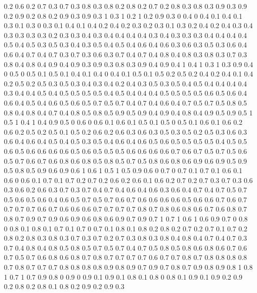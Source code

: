 0.2 0.6
0.2 0.7
0.3 0.7
0.3 0.8
0.3 0.8
0.2 0.8
0.2 0.7
0.2 0.8
0.3 0.8
0.3 0.9
0.3 0.9
0.2 0.9
0.2 0.8
0.2 0.9
0.3 0.9
0.3 1
0.3 1
0.2 1
0.2 0.9
0.3 0
0.4 0
0.4 0.1
0.4 0.1
0.3 0.1
0.3 0
0.3 0.1
0.4 0.1
0.4 0.2
0.4 0.2
0.3 0.2
0.3 0.1
0.3 0.2
0.4 0.2
0.4 0.3
0.4 0.3
0.3 0.3
0.3 0.2
0.3 0.3
0.4 0.3
0.4 0.4
0.4 0.4
0.3 0.4
0.3 0.3
0.3 0.4
0.4 0.4
0.4 0.5
0.4 0.5
0.3 0.5
0.3 0.4
0.3 0.5
0.4 0.5
0.4 0.6
0.4 0.6
0.3 0.6
0.3 0.5
0.3 0.6
0.4 0.6
0.4 0.7
0.4 0.7
0.3 0.7
0.3 0.6
0.3 0.7
0.4 0.7
0.4 0.8
0.4 0.8
0.3 0.8
0.3 0.7
0.3 0.8
0.4 0.8
0.4 0.9
0.4 0.9
0.3 0.9
0.3 0.8
0.3 0.9
0.4 0.9
0.4 1
0.4 1
0.3 1
0.3 0.9
0.4 0
0.5 0
0.5 0.1
0.5 0.1
0.4 0.1
0.4 0
0.4 0.1
0.5 0.1
0.5 0.2
0.5 0.2
0.4 0.2
0.4 0.1
0.4 0.2
0.5 0.2
0.5 0.3
0.5 0.3
0.4 0.3
0.4 0.2
0.4 0.3
0.5 0.3
0.5 0.4
0.5 0.4
0.4 0.4
0.4 0.3
0.4 0.4
0.5 0.4
0.5 0.5
0.5 0.5
0.4 0.5
0.4 0.4
0.4 0.5
0.5 0.5
0.5 0.6
0.5 0.6
0.4 0.6
0.4 0.5
0.4 0.6
0.5 0.6
0.5 0.7
0.5 0.7
0.4 0.7
0.4 0.6
0.4 0.7
0.5 0.7
0.5 0.8
0.5 0.8
0.4 0.8
0.4 0.7
0.4 0.8
0.5 0.8
0.5 0.9
0.5 0.9
0.4 0.9
0.4 0.8
0.4 0.9
0.5 0.9
0.5 1
0.5 1
0.4 1
0.4 0.9
0.5 0
0.6 0
0.6 0.1
0.6 0.1
0.5 0.1
0.5 0
0.5 0.1
0.6 0.1
0.6 0.2
0.6 0.2
0.5 0.2
0.5 0.1
0.5 0.2
0.6 0.2
0.6 0.3
0.6 0.3
0.5 0.3
0.5 0.2
0.5 0.3
0.6 0.3
0.6 0.4
0.6 0.4
0.5 0.4
0.5 0.3
0.5 0.4
0.6 0.4
0.6 0.5
0.6 0.5
0.5 0.5
0.5 0.4
0.5 0.5
0.6 0.5
0.6 0.6
0.6 0.6
0.5 0.6
0.5 0.5
0.5 0.6
0.6 0.6
0.6 0.7
0.6 0.7
0.5 0.7
0.5 0.6
0.5 0.7
0.6 0.7
0.6 0.8
0.6 0.8
0.5 0.8
0.5 0.7
0.5 0.8
0.6 0.8
0.6 0.9
0.6 0.9
0.5 0.9
0.5 0.8
0.5 0.9
0.6 0.9
0.6 1
0.6 1
0.5 1
0.5 0.9
0.6 0
0.7 0
0.7 0.1
0.7 0.1
0.6 0.1
0.6 0
0.6 0.1
0.7 0.1
0.7 0.2
0.7 0.2
0.6 0.2
0.6 0.1
0.6 0.2
0.7 0.2
0.7 0.3
0.7 0.3
0.6 0.3
0.6 0.2
0.6 0.3
0.7 0.3
0.7 0.4
0.7 0.4
0.6 0.4
0.6 0.3
0.6 0.4
0.7 0.4
0.7 0.5
0.7 0.5
0.6 0.5
0.6 0.4
0.6 0.5
0.7 0.5
0.7 0.6
0.7 0.6
0.6 0.6
0.6 0.5
0.6 0.6
0.7 0.6
0.7 0.7
0.7 0.7
0.6 0.7
0.6 0.6
0.6 0.7
0.7 0.7
0.7 0.8
0.7 0.8
0.6 0.8
0.6 0.7
0.6 0.8
0.7 0.8
0.7 0.9
0.7 0.9
0.6 0.9
0.6 0.8
0.6 0.9
0.7 0.9
0.7 1
0.7 1
0.6 1
0.6 0.9
0.7 0
0.8 0
0.8 0.1
0.8 0.1
0.7 0.1
0.7 0
0.7 0.1
0.8 0.1
0.8 0.2
0.8 0.2
0.7 0.2
0.7 0.1
0.7 0.2
0.8 0.2
0.8 0.3
0.8 0.3
0.7 0.3
0.7 0.2
0.7 0.3
0.8 0.3
0.8 0.4
0.8 0.4
0.7 0.4
0.7 0.3
0.7 0.4
0.8 0.4
0.8 0.5
0.8 0.5
0.7 0.5
0.7 0.4
0.7 0.5
0.8 0.5
0.8 0.6
0.8 0.6
0.7 0.6
0.7 0.5
0.7 0.6
0.8 0.6
0.8 0.7
0.8 0.7
0.7 0.7
0.7 0.6
0.7 0.7
0.8 0.7
0.8 0.8
0.8 0.8
0.7 0.8
0.7 0.7
0.7 0.8
0.8 0.8
0.8 0.9
0.8 0.9
0.7 0.9
0.7 0.8
0.7 0.9
0.8 0.9
0.8 1
0.8 1
0.7 1
0.7 0.9
0.8 0
0.9 0
0.9 0.1
0.9 0.1
0.8 0.1
0.8 0
0.8 0.1
0.9 0.1
0.9 0.2
0.9 0.2
0.8 0.2
0.8 0.1
0.8 0.2
0.9 0.2
0.9 0.3
